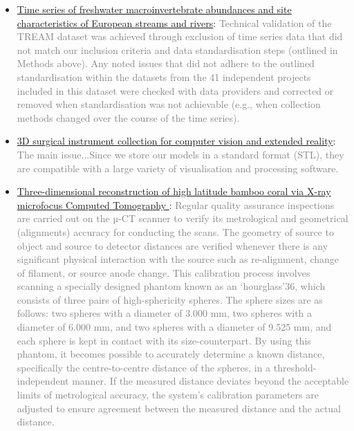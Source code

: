\documentclass[fleqn,10pt]{wlscirep}
\begin{document}
\begin{itemize}
\begin{itemize}
\begin{itemize}
      \item
      \href{https://www.nature.com/articles/s41597-024-03445-3?_gl=1*1ikco52*_up*MQ..&gclid=EAIaIQobChMInOXO84DVhgMViewWBR3vWQJAEAAYASAAEgJICfD_BwE#Sec11}{Time series of freshwater macroinvertebrate abundances and site characteristics of European streams and rivers}: \textcolor{gray}{Technical validation of the TREAM dataset was achieved through exclusion of time series data that did not match our inclusion criteria and data standardisation steps (outlined in Methods above). Any noted issues that did not adhere to the outlined standardisation within the datasets from the 41 independent projects included in this dataset were checked with data providers and corrected or removed when standardisation was not achievable (e.g., when collection methods changed over the course of the time series).}
      
      \item
      \href{https://www.nature.com/articles/s41597-023-02684-0?_gl=1*1t69zgo*_up*MQ..&gclid=EAIaIQobChMInOXO84DVhgMViewWBR3vWQJAEAAYASAAEgJICfD_BwE#Sec12}{3D surgical instrument collection for computer vision and extended reality}: \textcolor{gray}{The main issue...Since we store our models in a standard format (STL), they are compatible with a large variety of visualisation and processing software.}
      
      \item
      \href{https://www.nature.com/articles/s41597-024-03396-9?_gl=1*1ikco52*_up*MQ..&gclid=EAIaIQobChMInOXO84DVhgMViewWBR3vWQJAEAAYASAAEgJICfD_BwE#Sec4}{Three-dimensional reconstruction of high latitude bamboo coral via X-ray microfocus Computed Tomography
}: \textcolor{gray}{Regular quality assurance inspections are carried out on the µ-CT scanner to verify its metrological and geometrical (alignments) accuracy for conducting the scans. The geometry of source to object and source to detector distances are verified whenever there is any significant physical interaction with the source such as re-alignment, change of filament, or source anode change. This calibration process involves scanning a specially designed phantom known as an ‘hourglass’36, which consists of three pairs of high-sphericity spheres. The sphere sizes are as follows: two spheres with a diameter of 3.000 mm, two spheres with a diameter of 6.000 mm, and two spheres with a diameter of 9.525 mm, and each sphere is kept in contact with its size-counterpart. By using this phantom, it becomes possible to accurately determine a known distance, specifically the centre-to-centre distance of the spheres, in a threshold-independent manner. If the measured distance deviates beyond the acceptable limits of metrological accuracy, the system’s calibration parameters are adjusted to ensure agreement between the measured distance and the actual distance.}
      
      \end{itemize}
      
    \end{itemize}
  
\end{itemize}
\end{document}
